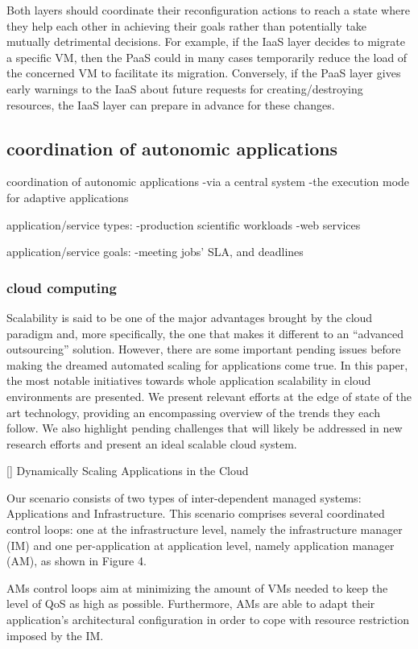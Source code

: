Both layers should coordinate their reconfiguration actions to reach a state where they help each other in achieving their goals rather than potentially take mutually detrimental decisions. For example, if the IaaS layer decides to migrate a specific VM, then the PaaS could in many cases temporarily reduce the load of the concerned VM to facilitate its migration. Conversely, if the PaaS layer gives early warnings to the IaaS about future
requests for creating/destroying resources, the IaaS layer can prepare in advance for these changes. 

\subsection{coordination of autonomic applications}
coordination of autonomic applications
-via a central system
-the execution mode for adaptive applications

application/service types:
-production scientific workloads
-web services

application/service goals:
-meeting jobs' SLA, and deadlines


\subsubsection{cloud computing}

Scalability is said to be one of the major advantages brought by the cloud paradigm and, more specifically, the one that makes it different to an “advanced outsourcing” solution. However, there are some important pending issues before making the dreamed automated scaling for applications come true. In this paper, the most notable initiatives towards whole application scalability in cloud environments are presented. We present relevant efforts at the edge of state of the art technology, providing an encompassing overview of the trends they each follow. We also highlight pending challenges that will likely be addressed in new research efforts and present an ideal scalable cloud system.

[] Dynamically Scaling Applications in the Cloud

Our scenario consists of two types of inter-dependent managed systems: Applications and Infrastructure.
This scenario comprises several coordinated control loops: one at the infrastructure level, namely the infrastructure manager (IM) and one per-application at application level, namely application manager (AM), as shown in Figure 4.

AMs control loops aim at minimizing the amount of VMs needed to keep the level of QoS as high as possible. Furthermore, AMs are able to adapt their application’s architectural configuration in order to cope with resource restriction imposed by the IM.

